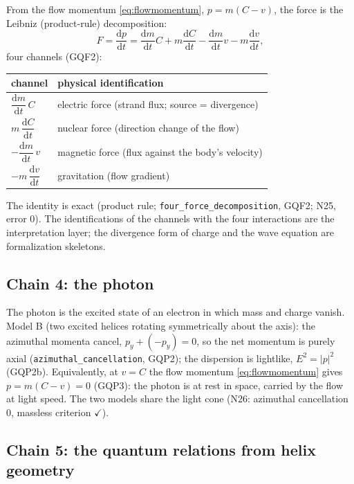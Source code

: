 \documentclass[aps,prd,preprint,superscriptaddress,amsmath,amssymb]{revtex4-2}
\begin{document}
From the flow momentum \eqref{eq:flowmomentum},
$p=m(C-v)$, the force is the Leibniz (product-rule) decomposition:
\begin{equation}
F=\frac{\mathrm dp}{\mathrm dt}
=\frac{\mathrm dm}{\mathrm dt}C
+m\frac{\mathrm dC}{\mathrm dt}
-\frac{\mathrm dm}{\mathrm dt}v
-m\frac{\mathrm dv}{\mathrm dt},
\label{eq:fourforces}
\end{equation}
four channels (GQF2):
\begin{center}
\begin{tabular}{ll}
\toprule
channel & physical identification \\
\midrule
$\dfrac{\mathrm dm}{\mathrm dt}\,C$ & electric force (strand flux; source = divergence) \\
$m\,\dfrac{\mathrm dC}{\mathrm dt}$ & nuclear force (direction change of the flow) \\
$-\dfrac{\mathrm dm}{\mathrm dt}\,v$ & magnetic force (flux against the body's velocity) \\
$-m\,\dfrac{\mathrm dv}{\mathrm dt}$ & gravitation (flow gradient) \\
\bottomrule
\end{tabular}
\end{center}
The identity is exact (product rule; \texttt{four\_force\_decomposition},
GQF2; N25, error $0$).  The identifications of the channels with the
four interactions are the interpretation layer; the divergence form of
charge and the wave equation are formalization skeletons.

\subsection{Chain 4: the photon}
\label{app:chain4}

The photon is the excited state of an electron \cite{einstein1905erzeugung} in
which mass and charge vanish.  Model B (two excited helices rotating
symmetrically about the axis): the azimuthal momenta cancel,
$p_y+(-p_y)=0$, so the net momentum is purely axial
(\texttt{azimuthal\_cancellation}, GQP2); the dispersion is lightlike,
$E^2=|p|^2$ (GQP2b).  Equivalently, at $v=C$ the flow momentum
\eqref{eq:flowmomentum} gives $p=m(C-v)=0$ (GQP3): the photon is at rest
in space, carried by the flow at light speed.  The two models share the
light cone (N26: azimuthal cancellation $0$, massless criterion
$\checkmark$).

\subsection{Chain 5: the quantum relations from helix geometry}
\label{app:chain5}
\end{document}
